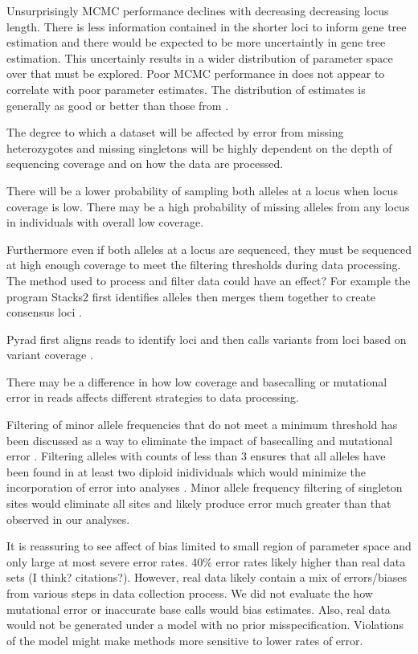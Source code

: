 Unsurprisingly MCMC performance declines with decreasing decreasing locus length.
There is less information contained in the shorter loci to inform gene tree estimation 
and there would be expected to be more uncertaintly in gene tree estimation.
This uncertainly results in a wider distribution of parameter space over that
must be explored.
Poor MCMC performance in \beast does not appear to correlate with poor parameter 
estimates. The distribution of estimates is generally as good or better than those 
from \ecoevolity. 


%
The degree to which a dataset will be affected by error from missing heterozygotes
and missing singletons will be highly dependent on the depth of sequencing coverage
and on how the data are processed. 

There will be a lower probability of sampling both alleles at a locus when locus 
coverage is low. There may be a high probability of missing alleles from any 
locus in individuals with overall low coverage. 

Furthermore even if both alleles at a locus are sequenced, they must be sequenced
at high enough coverage to meet the filtering thresholds during data processing.
The method used to process and filter data could have an effect?
For example the program Stacks2 first identifies alleles then merges them 
together to create consensus loci \citep{rochetteStacksAnalyticalMethods2019}. 

Pyrad first aligns reads to identify loci and then calls variants from loci 
based on variant coverage \citep{PyRADeatonAssemblyNovo2014}.

There may be a difference in how low coverage and basecalling or mutational error in reads
affects different strategies to data processing.



%
Filtering of minor allele frequencies that do not meet a minimum threshold has 
been discussed as a way to eliminate the impact of basecalling and mutational 
error \citep{linckMinorAlleleFrequency2019}.
Filtering alleles with counts of less than 3 ensures that all alleles have been 
found in at least two diploid inidividuals which would minimize the incorporation 
of error into analyses \citep{rochetteStacksAnalyticalMethods2019}.
Minor allele frequency filtering of singleton sites would eliminate all sites 
and likely produce error much greater than that observed in our analyses.


%
It is reassuring to see affect of bias limited to small region of parameter 
space and only large at most severe error rates.
40\% error rates likely higher than real data sets (I think? citations?).
However, real data likely contain a mix of errors/biases from
various steps in data collection process. We did not evaluate the how mutational
error or inaccurate base calls would bias estimates.
Also, real data would not be generated under a model with no prior misspecification.
Violations of the model might make methods more sensitive to lower rates of error.


